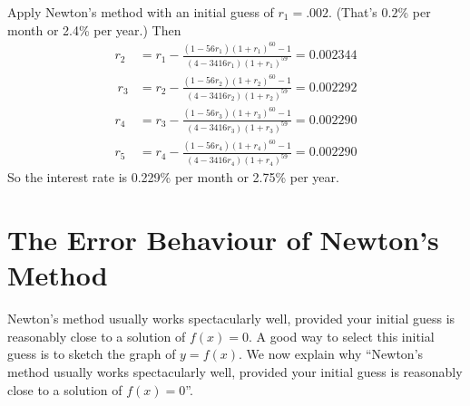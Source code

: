 \begin{eg}[interest rate]
Apply Newton's method with an initial guess of $r_1=.002$. 
(That's $0.2$\% per month or 2.4\% per year.) Then
\begin{align*}
r_2&=r_1-\frac{(1-56r_1)(1+r_1)^{60}-1}{(4-3416r_1)(1+r_1)^{59}}=0.002344\\\
r_3&=r_2-\frac{(1-56r_2)(1+r_2)^{60}-1}{(4-3416r_2)(1+r_2)^{59}}=0.002292\\
r_4&=r_3-\frac{(1-56r_3)(1+r_3)^{60}-1}{(4-3416r_3)(1+r_3)^{59}}=0.002290\\
r_5&=r_4-\frac{(1-56r_4)(1+r_4)^{60}-1}{(4-3416r_4)(1+r_4)^{59}}=0.002290
\end{align*}
So the interest rate is 0.229\% per month or 2.75\% per year.
\end{eg}

\section{The Error Behaviour of Newton's Method}

Newton's method usually works spectacularly well, provided your
initial guess is reasonably close to a solution of $f(x)=0$. A good way
to select this initial guess is to sketch the graph of $y=f(x)$. We
now explain why ``Newton's method usually works spectacularly 
well, provided your initial guess is reasonably close to a solution 
of $f(x)=0$''. 

